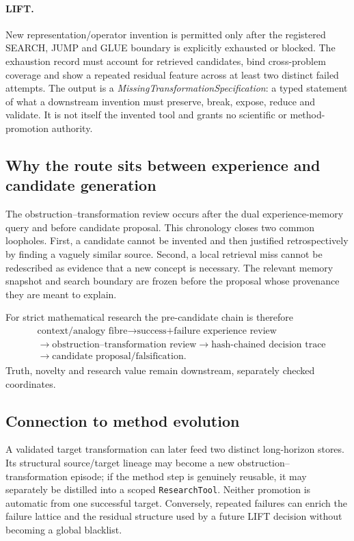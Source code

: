 \paragraph{LIFT.}
New representation/operator invention is permitted only after the registered SEARCH, JUMP and GLUE boundary is explicitly exhausted or blocked. The exhaustion record must account for retrieved candidates, bind cross-problem coverage and show a repeated residual feature across at least two distinct failed attempts. The output is a \emph{MissingTransformationSpecification}: a typed statement of what a downstream invention must preserve, break, expose, reduce and validate. It is not itself the invented tool and grants no scientific or method-promotion authority.

\subsection{Why the route sits between experience and candidate generation}

The obstruction--transformation review occurs after the dual experience-memory query and before candidate proposal. This chronology closes two common loopholes. First, a candidate cannot be invented and then justified retrospectively by finding a vaguely similar source. Second, a local retrieval miss cannot be redescribed as evidence that a new concept is necessary. The relevant memory snapshot and search boundary are frozen before the proposal whose provenance they are meant to explain.

For strict mathematical research the pre-candidate chain is therefore
\begin{equation}
\begin{aligned}
&\text{context/analogy fibre}
\rightarrow \text{success+failure experience review}\\
&\rightarrow \text{obstruction--transformation review}
\rightarrow \text{hash-chained decision trace}\\
&\rightarrow \text{candidate proposal/falsification}.
\end{aligned}
\end{equation}
Truth, novelty and research value remain downstream, separately checked coordinates.

\subsection{Connection to method evolution}

A validated target transformation can later feed two distinct long-horizon stores. Its structural source/target lineage may become a new obstruction--transformation episode; if the method step is genuinely reusable, it may separately be distilled into a scoped \texttt{ResearchTool}. Neither promotion is automatic from one successful target. Conversely, repeated failures can enrich the failure lattice and the residual structure used by a future LIFT decision without becoming a global blacklist.

